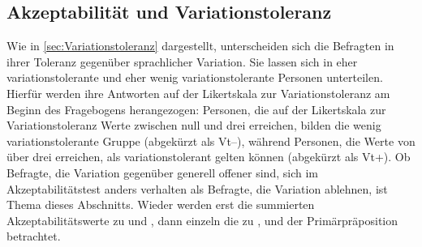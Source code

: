 \subsection{Akzeptabilität und Variationstoleranz}
\label{sec:ErgAkzNachVT}
Wie in \autoref{sec:Variationstoleranz} dargestellt, unterscheiden sich die Befragten in ihrer Toleranz gegenüber sprachlicher Variation. 
Sie lassen sich in eher variationstolerante und eher wenig variationstolerante Personen unterteilen. 
Hierfür werden ihre Antworten auf der Likertskala zur Variationstoleranz am Beginn des Fragebogens herangezogen: 
Personen, die auf der Likertskala zur Variationstoleranz Werte zwischen null und drei erreichen, bilden die wenig variationstolerante Gruppe (abgekürzt als Vt--), während Personen, die Werte von über drei erreichen, als variationstolerant gelten können (abgekürzt als Vt+). 
Ob Befragte, die Variation gegenüber generell offener sind, sich im Akzeptabilitätstest anders verhalten als Befragte, die Variation ablehnen, ist Thema dieses Abschnitts. 
Wieder werden erst die summierten Akzeptabilitätswerte zu \wegen{} und \waehrend{}, dann einzeln die zu \dank{}, \gegenueber{} und der Primärpräposition  betrachtet. 

